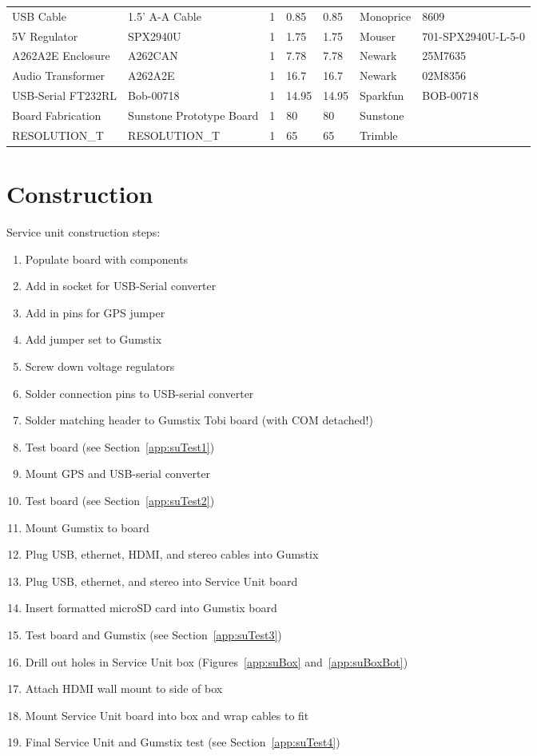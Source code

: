 \begin{landscape}
\begin{center}
\begin{longtable}{|p{2in}|p{1.5in}|p{.75in}|p{.5in}|p{.5in}|p{1in}|p{1.5in}|}
USB Cable & 1.5' A-A Cable & 1 & 0.85 & 0.85 & Monoprice & 8609\\ 
5V Regulator & SPX2940U & 1 & 1.75 & 1.75 & Mouser & 701-SPX2940U-L-5-0\\ 
A262A2E Enclosure & A262CAN & 1 & 7.78 & 7.78 & Newark & 25M7635\\ 
Audio Transformer & A262A2E & 1 & 16.7 & 16.7 & Newark & 02M8356\\ 
USB-Serial FT232RL & Bob-00718 & 1 & 14.95 & 14.95 & Sparkfun & BOB-00718\\ 
Board Fabrication & Sunstone Prototype Board & 1 & 80 & 80 & Sunstone & \\ 
RESOLUTION\_T & RESOLUTION\_T & 1 & 65 & 65 & Trimble & 
\end{longtable}
\end{center}
\end{landscape}

\section{Construction}

Service unit construction steps:

\begin{enumerate}
\item{Populate board with components}
\item{Add in socket for USB-Serial converter}
\item{Add in pins for GPS jumper}
\item{Add jumper set to Gumstix}
\item{Screw down voltage regulators}
\item{Solder connection pins to USB-serial converter}
\item{Solder matching header to Gumstix Tobi board (with COM detached!)}
\item{Test board (see Section~\ref{app:suTest1})}
\item{Mount GPS and USB-serial converter}
\item{Test board (see Section~\ref{app:suTest2})}
\item{Mount Gumstix to board}
\item{Plug USB, ethernet, HDMI, and stereo cables into Gumstix}
\item{Plug USB, ethernet, and stereo into Service Unit board}
\item{Insert formatted microSD card into Gumstix board}
\item{Test board and Gumstix (see Section~\ref{app:suTest3})}
\item{Drill out holes in Service Unit box (Figures~\ref{app:suBox} and~\ref{app:suBoxBot})}
\item{Attach HDMI wall mount to side of box}
\item{Mount Service Unit board into box and wrap cables to fit}
\item{Final Service Unit and Gumstix test (see Section~\ref{app:suTest4})}
\end{enumerate}

